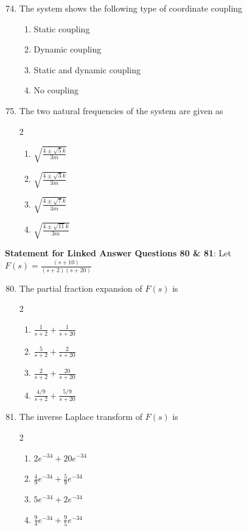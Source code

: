 \begin{enumerate}
    \setcounter{enumi}{73}
    \item The system shows the following type of coordinate coupling
    \begin{enumerate}
        \item Static coupling
        \item Dynamic coupling
        \item Static and dynamic coupling
        \item No coupling
    \end{enumerate}

    \item The two natural frequencies of the system are given as
    \begin{multicols}{2}
    \begin{enumerate}
        \item $\sqrt{\frac{4 \pm \sqrt{5} k}{3 m}}$
        \item $\sqrt{\frac{4 \pm \sqrt{3} k}{3 m}}$
        \item $\sqrt{\frac{4 \pm \sqrt{7} k}{3 m}}$
        \item $\sqrt{\frac{4 \pm \sqrt{11} k}{3 m}}$
    \end{enumerate}
    \end{multicols}
    
\end{enumerate}

\textbf{Statement for Linked Answer Questions 80 \& 81}:
Let $F(s) = \frac{(s + 10)}{(s +2)(s + 20)}$

\begin{enumerate}
    \setcounter{enumi}{79}
    \item The partial fraction expansion of $F(s)$ is
    \begin{multicols}{2}
    \begin{enumerate}
        \item $\frac{1}{s + 2} + \frac{1}{s + 20}$
        \item $\frac{5}{s + 2} + \frac{2}{s + 20}$
        \item $\frac{2}{s + 2} + \frac{20}{s + 20}$
        \item $\frac{4/9}{s + 2} + \frac{5/9}{s + 20}$
    \end{enumerate}
    \end{multicols}
    

    \item The inverse Laplace transform of $F(s)$ is
    \begin{multicols}{2}
    \begin{enumerate}
        \item $2e^{-34} + 20e^{-34}$
        \item $\frac{4}{9}e^{-34} + \frac{5}{9}e^{-34}$
        \item $5e^{-34} + 2e^{-34}$
        \item $\frac{9}{4}e^{-34} + \frac{9}{5}e^{-34}$
    \end{enumerate}
    \end{multicols}
    
\end{enumerate}

